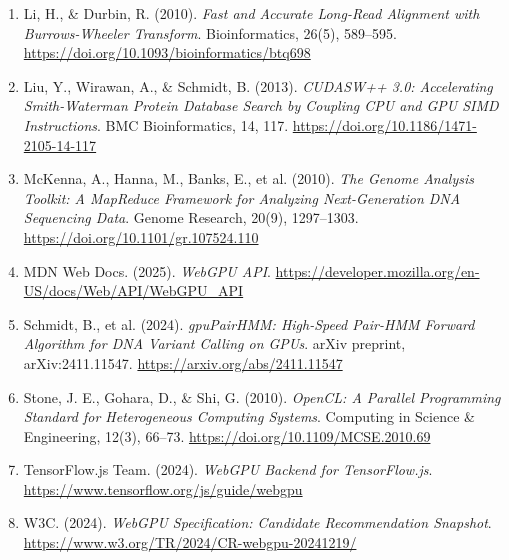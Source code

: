 \documentclass[12pt]{report}
\begin{document}
\begin{enumerate}
    \item Li, H., \& Durbin, R. (2010). \emph{Fast and Accurate Long-Read Alignment with Burrows-Wheeler Transform}. Bioinformatics, 26(5), 589–595. \url{https://doi.org/10.1093/bioinformatics/btq698}
    \item Liu, Y., Wirawan, A., \& Schmidt, B. (2013). \emph{CUDASW++ 3.0: Accelerating Smith-Waterman Protein Database Search by Coupling CPU and GPU SIMD Instructions}. BMC Bioinformatics, 14, 117. \url{https://doi.org/10.1186/1471-2105-14-117}
    \item McKenna, A., Hanna, M., Banks, E., et al. (2010). \emph{The Genome Analysis Toolkit: A MapReduce Framework for Analyzing Next-Generation DNA Sequencing Data}. Genome Research, 20(9), 1297–1303. \url{https://doi.org/10.1101/gr.107524.110}
    \item MDN Web Docs. (2025). \emph{WebGPU API}. \url{https://developer.mozilla.org/en-US/docs/Web/API/WebGPU_API}
    \item Schmidt, B., et al. (2024). \emph{gpuPairHMM: High-Speed Pair-HMM Forward Algorithm for DNA Variant Calling on GPUs}. arXiv preprint, arXiv:2411.11547. \url{https://arxiv.org/abs/2411.11547}
    \item Stone, J. E., Gohara, D., \& Shi, G. (2010). \emph{OpenCL: A Parallel Programming Standard for Heterogeneous Computing Systems}. Computing in Science \& Engineering, 12(3), 66–73. \url{https://doi.org/10.1109/MCSE.2010.69}
    \item TensorFlow.js Team. (2024). \emph{WebGPU Backend for TensorFlow.js}. \url{https://www.tensorflow.org/js/guide/webgpu}
    \item W3C. (2024). \emph{WebGPU Specification: Candidate Recommendation Snapshot}. \url{https://www.w3.org/TR/2024/CR-webgpu-20241219/}
\end{enumerate}
\end{document}
